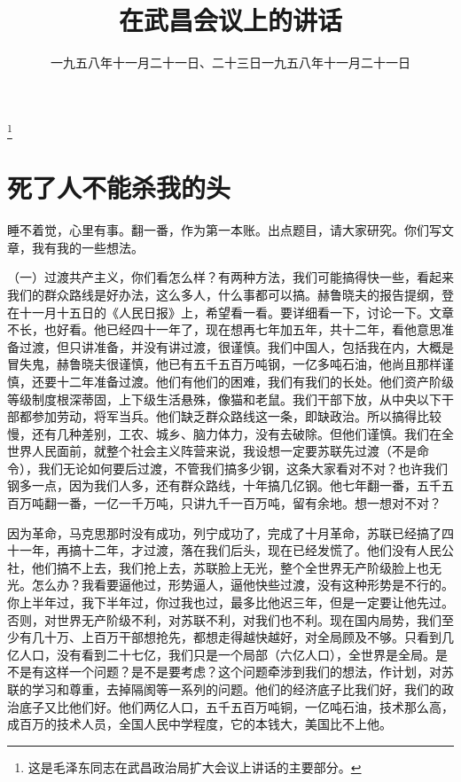 
\title{在武昌会议上的讲话}
\date{一九五八年十一月二十一日、二十三日}
\thanks{这是毛泽东同志在武昌政治局扩大会议上讲话的主要部分。}
\maketitle


\date{一九五八年十一月二十一日}
\section{死了人不能杀我的头}

睡不着觉，心里有事。翻一番，作为第一本账。出点题目，请大家研究。你们写文章，我有我的一些想法。

（一）过渡共产主义，你们看怎么样？有两种方法，我们可能搞得快一些，看起来我们的群众路线是好办法，这么多人，什么事都可以搞。赫鲁晓夫的报告提纲，登在十一月十五日的《人民日报》上，希望看一看。要详细看一下，讨论一下。文章不长，也好看。他已经四十一年了，现在想再七年加五年，共十二年，看他意思准备过渡，但只讲准备，并没有讲过渡，很谨慎。我们中国人，包括我在内，大概是冒失鬼，赫鲁晓夫很谨慎，他已有五千五百万吨钢，一亿多吨石油，他尚且那样谨慎，还要十二年准备过渡。他们有他们的困难，我们有我们的长处。他们资产阶级等级制度根深蒂固，上下级生活悬殊，像猫和老鼠。我们干部下放，从中央以下干部都参加劳动，将军当兵。他们缺乏群众路线这一条，即缺政治。所以搞得比较慢，还有几种差别，工农、城乡、脑力体力，没有去破除。但他们谨慎。我们在全世界人民面前，就整个社会主义阵营来说，我设想一定要苏联先过渡（不是命令），我们无论如何要后过渡，不管我们搞多少钢，这条大家看对不对？也许我们钢多一点，因为我们人多，还有群众路线，十年搞几亿钢。他七年翻一番，五千五百万吨翻一番，一亿一千万吨，只讲九千一百万吨，留有余地。想一想对不对？

因为革命，马克思那时没有成功，列宁成功了，完成了十月革命，苏联已经搞了四十一年，再搞十二年，才过渡，落在我们后头，现在已经发慌了。他们没有人民公社，他们搞不上去，我们抢上去，苏联脸上无光，整个全世界无产阶级脸上也无光。怎么办？我看要逼他过，形势逼人，逼他快些过渡，没有这种形势是不行的。你上半年过，我下半年过，你过我也过，最多比他迟三年，但是一定要让他先过。否则，对世界无产阶级不利，对苏联不利，对我们也不利。现在国内局势，我们至少有几十万、上百万干部想抢先，都想走得越快越好，对全局顾及不够。只看到几亿人口，没有看到二十七亿，我们只是一个局部（六亿人口），全世界是全局。是不是有这样一个问题？是不是要考虑？这个问题牵涉到我们的想法，作计划，对苏联的学习和尊重，去掉隔阂等一系列的问题。他们的经济底子比我们好，我们的政治底子又比他们好。他们两亿人口，五千五百万吨铜，一亿吨石油，技术那么高，成百万的技术人员，全国人民中学程度，它的本钱大，美国比不上他。

